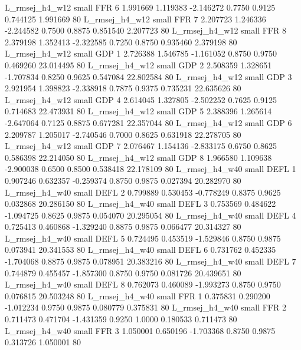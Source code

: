 L_rmsej_h4_w12      small      FFR                 6 1.991669 1.119383 -2.146272 0.7750 0.9125  0.744125    1.991669 80
L_rmsej_h4_w12      small      FFR                 7 2.207723 1.246336 -2.244582 0.7500 0.8875  0.851540    2.207723 80
L_rmsej_h4_w12      small      FFR                 8 2.379198 1.352413 -2.322585 0.7250 0.8750  0.935460    2.379198 80
L_rmsej_h4_w12      small      GDP                 1 2.726388 1.546785 -1.161052 0.8750 0.9750  0.469260   23.014495 80
L_rmsej_h4_w12      small      GDP                 2 2.508359 1.328651 -1.707834 0.8250 0.9625  0.547084   22.802584 80
L_rmsej_h4_w12      small      GDP                 3 2.921954 1.398823 -2.338918 0.7875 0.9375  0.735231   22.635626 80
L_rmsej_h4_w12      small      GDP                 4 2.614045 1.327805 -2.502252 0.7625 0.9125  0.714683   22.473931 80
L_rmsej_h4_w12      small      GDP                 5 2.388396 1.265614 -2.647064 0.7125 0.8875  0.677281   22.357044 80
L_rmsej_h4_w12      small      GDP                 6 2.209787 1.205017 -2.740546 0.7000 0.8625  0.631918   22.278705 80
L_rmsej_h4_w12      small      GDP                 7 2.076467 1.154136 -2.833175 0.6750 0.8625  0.586398   22.214050 80
L_rmsej_h4_w12      small      GDP                 8 1.966580 1.109638 -2.900038 0.6500 0.8500  0.538418   22.178109 80
L_rmsej_h4_w40      small     DEFL                 1 0.907246 0.632357 -0.259374 0.8750 0.9875  0.027394   20.282970 80
L_rmsej_h4_w40      small     DEFL                 2 0.799889 0.530453 -0.778249 0.8375 0.9625  0.032868   20.286150 80
L_rmsej_h4_w40      small     DEFL                 3 0.753569 0.484622 -1.094725 0.8625 0.9875  0.054070   20.295054 80
L_rmsej_h4_w40      small     DEFL                 4 0.725413 0.460868 -1.329240 0.8875 0.9875  0.066477   20.314327 80
L_rmsej_h4_w40      small     DEFL                 5 0.724495 0.453519 -1.529846 0.8750 0.9875  0.073941   20.341553 80
L_rmsej_h4_w40      small     DEFL                 6 0.731762 0.452335 -1.704068 0.8875 0.9875  0.078951   20.383216 80
L_rmsej_h4_w40      small     DEFL                 7 0.744879 0.455457 -1.857300 0.8750 0.9750  0.081726   20.439651 80
L_rmsej_h4_w40      small     DEFL                 8 0.762073 0.460089 -1.993273 0.8750 0.9750  0.076815   20.503248 80
L_rmsej_h4_w40      small      FFR                 1 0.375831 0.290200 -1.012234 0.9750 0.9875  0.080779    0.375831 80
L_rmsej_h4_w40      small      FFR                 2 0.711473 0.471704 -1.431359 0.9250 1.0000  0.180533    0.711473 80
L_rmsej_h4_w40      small      FFR                 3 1.050001 0.650196 -1.703368 0.8750 0.9875  0.313726    1.050001 80
